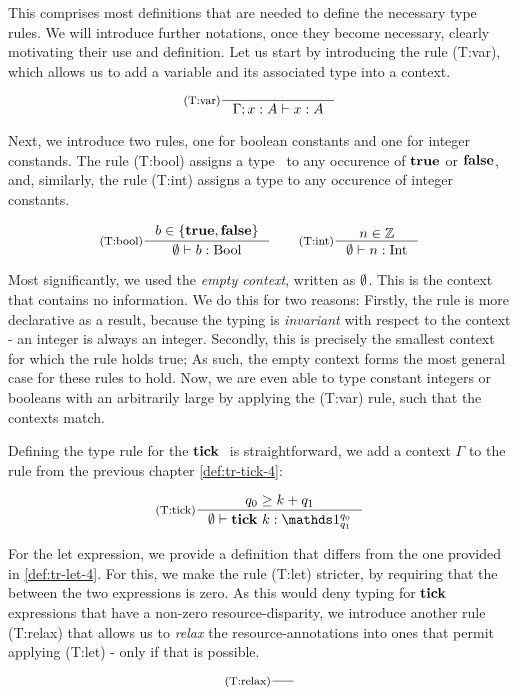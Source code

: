 This comprises most definitions that are needed to define the necessary type rules. We will introduce further notations, once they become necessary, clearly motivating their use and definition. Let us start by introducing the rule (T:var), which allows us to add a variable and its associated type into a context.

\[
   \inference[(T:var)]
   {}
   {\typing{\Gamma; x: A}{x}{A}}
\]

Next, we introduce two rules, one for boolean constants and one for integer constands. The rule (T:bool) assigns a type \bool~to any occurence of \(\mathbf{true}\) or \(\mathbf{false}\), and, similarly, the rule (T:int) assigns a type \typeint to any occurence of integer constants.

\[
   \inference[(T:bool)]
   {b \in \{\true, \false\}}
   {\typing{\emptycontext}{b}{\text{\bool}}}%
   \qquad
   \inference[(T:int)]
   {n \in \mathbb{Z}}
   {\typing{\emptycontext}{n}{\text{\typeint}}}
\]

Most significantly, we used the \emph{empty context}, written as \(\emptyset\). This is the context that contains no information. We do this for two reasons: Firstly, the rule is more declarative as a result, because the typing is \emph{invariant} with respect to the context - an integer is always an integer. Secondly, this is precisely the smallest context for which the rule holds true; As such, the empty context forms the most general case for these rules to hold. Now, we are even able to type constant integers or booleans with an arbitrarily large  by applying the (T:var) rule, such that the contexts match. 

Defining the type rule for the \(\mathbf{tick}~\) is straightforward, we add a context \(\Gamma\) to the rule from the previous chapter \cref{def:tr-tick-4}:

\[
   \inference[(T:tick)]
   {q_0 \geq k + q_1}
   {\typing{\emptycontext}{\tick{k}}{\ratype{\unit}{q_0}{q_1}}}
\]

For the let expression, we provide a definition that differs from the one provided in \cref{def:tr-let-4}. For this, we make the rule (T:let) stricter, by requiring that the  between the two expressions is zero. As this would deny typing for \(\mathbf{tick}~\) expressions that have a non-zero resource-disparity, we introduce another rule (T:relax) that allows us to \emph{relax} the resource-annotations into ones that permit applying (T:let) - only if that is possible. 

\[
   \inference[(T:relax)]
   {}
   {}
\]

